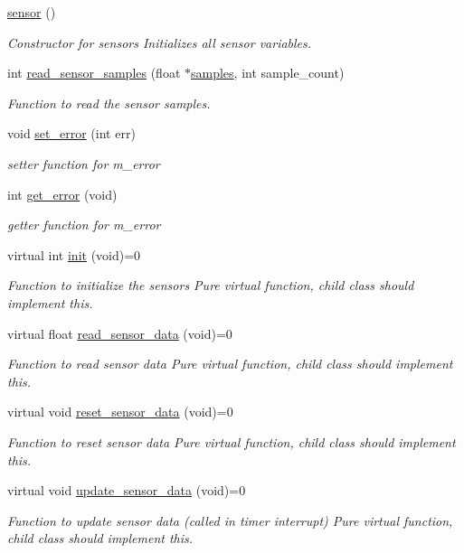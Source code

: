 \begin{DoxyCompactItemize}
\item 
\hyperlink{classsensor_aeaa38c2a2b5e33314a4fe9ff905dc0c6}{sensor} ()
\begin{DoxyCompactList}\small\item\em Constructor for sensors Initializes all sensor variables. \end{DoxyCompactList}\item 
int \hyperlink{group___ventilator_module_gaa646dcf1c12ed21dd027a49721e27b04}{read\+\_\+sensor\+\_\+samples} (float $\ast$\hyperlink{classsensor_a795220a22d60a8babb9383b002342220}{samples}, int sample\+\_\+count)
\begin{DoxyCompactList}\small\item\em Function to read the sensor samples. \end{DoxyCompactList}\item 
void \hyperlink{classsensor_af88b299557e0ac58b9fee93bfc2e5e22}{set\+\_\+error} (int err)
\begin{DoxyCompactList}\small\item\em setter function for m\+\_\+error \end{DoxyCompactList}\item 
int \hyperlink{classsensor_ac1312bdb1b0e23c215af87224a54e550}{get\+\_\+error} (void)
\begin{DoxyCompactList}\small\item\em getter function for m\+\_\+error \end{DoxyCompactList}\item 
virtual int \hyperlink{classsensor_aae55152b437f83053eb018b5ebac874e}{init} (void)=0
\begin{DoxyCompactList}\small\item\em Function to initialize the sensors Pure virtual function, child class should implement this. \end{DoxyCompactList}\item 
virtual float \hyperlink{classsensor_a682adbfb20854e2bce40b8a5c0aa6232}{read\+\_\+sensor\+\_\+data} (void)=0
\begin{DoxyCompactList}\small\item\em Function to read sensor data Pure virtual function, child class should implement this. \end{DoxyCompactList}\item 
virtual void \hyperlink{classsensor_a71fccbf71cc771db4775443bf899a5d3}{reset\+\_\+sensor\+\_\+data} (void)=0
\begin{DoxyCompactList}\small\item\em Function to reset sensor data Pure virtual function, child class should implement this. \end{DoxyCompactList}\item 
virtual void \hyperlink{classsensor_a8a8cdbc1c82a4089bf0a70f980fb37d4}{update\+\_\+sensor\+\_\+data} (void)=0
\begin{DoxyCompactList}\small\item\em Function to update sensor data (called in timer interrupt) Pure virtual function, child class should implement this. \end{DoxyCompactList}\end{DoxyCompactItemize}
